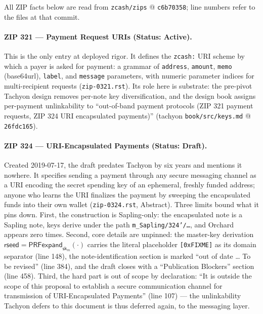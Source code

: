 \documentclass[11pt,a4paper]{article}
\theoremstyle{definition}
\begin{document}
All ZIP facts below are read from \texttt{zcash/zips} @ \texttt{c6b70358};
line numbers refer to the files at that commit.

\paragraph{ZIP 321 --- Payment Request URIs (Status: Active).}
This is the only entry at deployed rigor. It defines the \texttt{zcash:} URI
scheme by which a payer is asked for payment: a grammar of
\texttt{address}, \texttt{amount}, \texttt{memo} (base64url),
\texttt{label}, and \texttt{message} parameters, with numeric parameter
indices for multi-recipient requests (\texttt{zip-0321.rst}). Its role here
is substrate: the pre-pivot Tachyon design removes per-note key
diversification, and the design book assigns per-payment unlinkability to
``out-of-band payment protocols (ZIP 321 payment requests, ZIP 324 URI
encapsulated payments)'' (tachyon \texttt{book/src/keys.md} @
\texttt{26fdc165}).

\paragraph{ZIP 324 --- URI-Encapsulated Payments (Status: Draft).}
Created 2019-07-17, the draft predates Tachyon by six years and mentions it
nowhere. It specifies sending a payment through any secure messaging channel
as a URI encoding the secret spending key of an ephemeral, freshly funded
address; anyone who learns the URI finalizes the payment by sweeping the
encapsulated funds into their own wallet (\texttt{zip-0324.rst}, Abstract).
Three limits bound what it pins down. First, the construction is
Sapling-only: the encapsulated note is a Sapling note, keys derive under the
path \texttt{m\_Sapling/324'/\ldots}, and Orchard appears zero times.
Second, core details are unpinned: the master-key derivation
$\mathsf{rseed} = \mathsf{PRFexpand}_{\mathsf{sk}_m}(\cdot)$ carries the
literal placeholder \texttt{[0xFIXME]} as its domain separator (line 148),
the note-identification section is marked ``out of date \ldots{} To be
revised'' (line 384), and the draft closes with a ``Publication Blockers''
section (line 458). Third, the hard part is out of scope by declaration:
``It is outside the scope of this proposal to establish a secure
communication channel for transmission of URI-Encapsulated Payments''
(line 107) --- the unlinkability Tachyon defers to this document is thus
deferred again, to the messaging layer.
\end{document}
